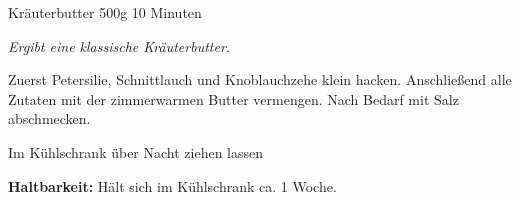 \documentclass[
  DIV=11,%
  pagesize,%
  fontsize=11pt,%
  paper=a4,%
]{scrartcl}
\begin{document}
\begin{recipe}{Kräuterbutter} {500g} {10 Minuten}

\freeform
\textit{Ergibt eine klassische Kräuterbutter.}


Zuerst Petersilie, Schnittlauch und Knoblauchzehe klein hacken.
Anschließend alle Zutaten mit der zimmerwarmen Butter vermengen.
Nach Bedarf mit Salz abschmecken.

\newstep
Im Kühlschrank über Nacht ziehen lassen

\freeform
\hrulefill

\freeform 
\textbf{Haltbarkeit:}
Hält sich im Kühlschrank ca. 1 Woche.

\end{recipe}
\end{document}
